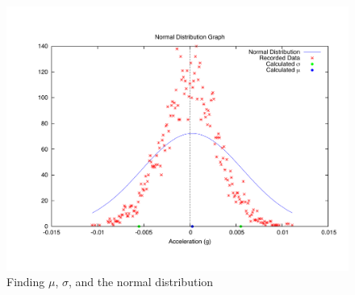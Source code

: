 \begin{figure}[h]
\centering
\includegraphics[trim = 0cm 2cm 0cm 2cm, clip, scale=0.45]{media/gnuplot/normaldist.pdf}
\caption{Finding $\mu$, $\sigma$, and the normal distribution}
\label{fig:finding-the-variance-chart}
\end{figure}
